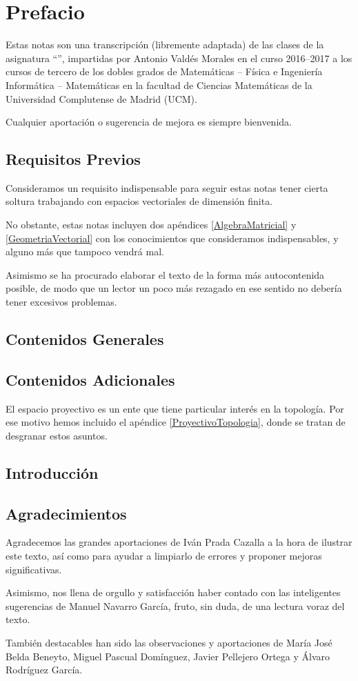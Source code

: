 \section*{Prefacio}
Estas notas son una transcripción (libremente adaptada) de las clases de la asignatura ``'', impartidas por Antonio Valdés Morales en el curso 2016--2017 a los cursos de tercero de los dobles grados de  Matemáticas -- Física e Ingeniería Informática -- Matemáticas en la facultad de Ciencias Matemáticas de la Universidad Complutense de Madrid (UCM).

Cualquier aportación o sugerencia de mejora es siempre bienvenida.
\subsection*{Requisitos Previos}
Consideramos un requisito indispensable para seguir estas notas tener cierta soltura trabajando con espacios vectoriales de dimensión finita.

No obstante, estas notas incluyen dos apéndices \eqref{AlgebraMatricial} y \eqref{GeometriaVectorial} con los conocimientos que consideramos indispensables, y alguno más que tampoco vendrá mal.

Asimismo se ha procurado elaborar el texto de la forma más autocontenida posible, de modo que un lector un poco más rezagado en ese sentido no debería tener excesivos problemas.
\subsection*{Contenidos Generales}

\subsection*{Contenidos Adicionales}
El espacio proyectivo es un ente que tiene particular interés en la topología. Por ese motivo hemos incluido el apéndice \ref{ProyectivoTopologia}, donde se tratan de desgranar estos asuntos.
\subsection*{Introducción}
\subsection*{Agradecimientos}
Agradecemos las grandes aportaciones de Iván Prada Cazalla a la hora de ilustrar este texto, así como para ayudar a limpiarlo de errores y proponer mejoras significativas.

Asimismo, nos llena de orgullo y satisfacción haber contado con las inteligentes sugerencias de Manuel Navarro García, fruto, sin duda, de una lectura voraz del texto.

También destacables han sido las observaciones y aportaciones de María José Belda Beneyto, Miguel Pascual Domínguez, Javier Pellejero Ortega y Álvaro Rodríguez García.